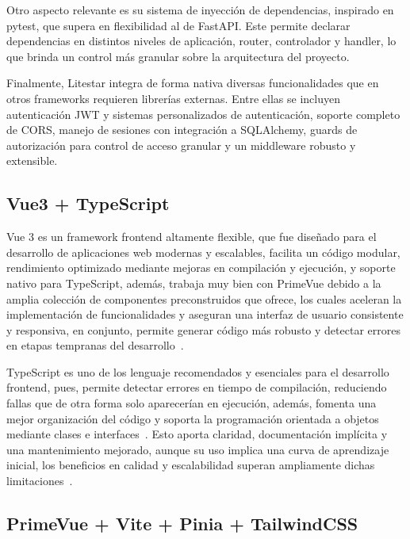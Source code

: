 Otro aspecto relevante es su sistema de inyección de dependencias, inspirado en pytest, que supera en flexibilidad al de FastAPI. Este permite declarar dependencias en distintos niveles de aplicación, router, controlador y handler, lo que brinda un control más granular sobre la arquitectura del proyecto.
~\cite{litestar_dependency_injection}~\cite{plainenglish_litestar_fastapi}

Finalmente, Litestar integra de forma nativa diversas funcionalidades que en otros frameworks requieren librerías externas. Entre ellas se incluyen autenticación JWT y sistemas personalizados de autenticación, soporte completo de CORS, manejo de sesiones con integración a SQLAlchemy, guards de autorización para control de acceso granular y un middleware robusto y extensible.
~\cite{betterstack_litestar_fastapi}~\cite{plainenglish_litestar_fastapi}~\cite{litestar_authentication}

\subsection{Vue3 + TypeScript}

Vue 3 es un framework frontend altamente flexible, que fue diseñado para el desarrollo de aplicaciones web modernas y escalables, facilita un código modular, rendimiento optimizado mediante mejoras en compilación y ejecución, y soporte nativo para TypeScript, además, trabaja muy bien con PrimeVue debido a la amplia colección de componentes preconstruidos que ofrece, los cuales aceleran la implementación de funcionalidades y aseguran una interfaz de usuario consistente y responsiva, en conjunto, permite generar código más robusto y detectar errores en etapas tempranas del desarrollo~\cite{immune_vue3}.

TypeScript es uno de los lenguaje recomendados y esenciales para el desarrollo frontend, pues, permite detectar errores en tiempo de compilación, reduciendo fallas que de otra forma solo aparecerían en ejecución, además, fomenta una mejor organización del código y soporta la programación orientada a objetos mediante clases e interfaces~\cite{acrocommerce_ts}.
Esto aporta claridad, documentación implícita y una mantenimiento mejorado, aunque su uso implica una curva de aprendizaje inicial, los beneficios en calidad y escalabilidad superan ampliamente dichas limitaciones~\cite{strapi_ts}.

\subsection{PrimeVue + Vite + Pinia + TailwindCSS}

